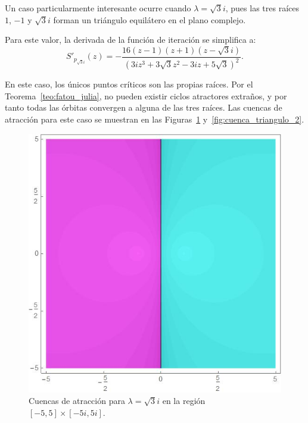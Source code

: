 Un caso particularmente interesante ocurre cuando $\lambda=\sqrt{3}i$, pues las tres raíces $1$, $-1$ y $\sqrt{3}i$ forman un triángulo equilátero en el plano complejo.

Para este valor, la derivada de la función de iteración se simplifica a:
$$
S'_{p_{\sqrt{3}i}}(z)=-\frac{16(z-1)(z+1)(z-\sqrt{3}i)}{(3iz^3+3\sqrt{3}z^2-3iz+5\sqrt{3})^2}.
$$

En este caso, los únicos puntos críticos son las propias raíces. Por el Teorema~\ref{teo:fatou_julia}, no pueden existir ciclos atractores extraños, y por tanto todas las órbitas convergen a alguna de las tres raíces. Las cuencas de atracción para este caso se muestran en las Figuras~\ref{fig:cuenca_triangulo_1} y~\ref{fig:cuenca_triangulo_2}.

\begin{figure}[H]
\centering 
\begin{minipage}[b]{0.48\textwidth}
\centering
\includegraphics[width=\textwidth]{fuentes/articulo-cuadraticos/imagenes/sch_n_6_m_6.jpg}
\caption{Cuencas de atracción para $\lambda=\sqrt{3}i$ en la región $[-5,5]\times[-5i,5i]$.}
\label{fig:cuenca_triangulo_1}
\end{minipage}
\hfill
\begin{minipage}[b]{0.48\textwidth}
\centering

\end{minipage}
\end{figure}
